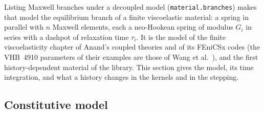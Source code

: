 \documentclass[11pt]{article}
\DeclareRobustCommand{\code}[1]{{\def\_{\textunderscore\allowbreak}\texttt{#1}}}
\begin{document}
Listing Maxwell branches under a decoupled model (\code{material.branches})
makes that model the equilibrium branch of a finite viscoelastic material:
a spring in parallel with $n$ Maxwell elements, each a neo-Hookean spring
of modulus $G_i$ in series with a dashpot of relaxation time $\tau_i$.  It
is the model of the finite viscoelasticity chapter of Anand's coupled
theories and of its FEniCSx codes \cite{anandbook} (the VHB~4910
parameters of their examples are those of Wang et al.\ \cite{wang2016}),
and the first history-dependent material of the library.  This section
gives the model, its time integration, and what a history changes in the
kernels and in the stepping.

\subsection{Constitutive model}
\end{document}
